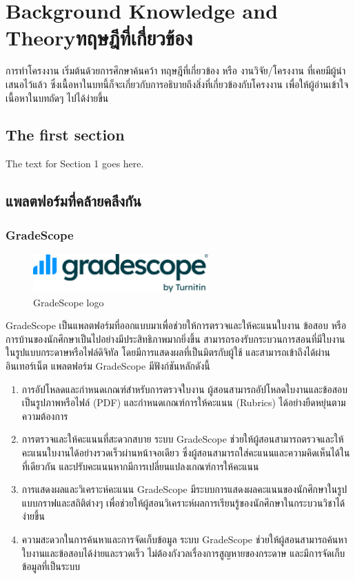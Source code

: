 \chapter{\ifenglish Background Knowledge and Theory\else ทฤษฎีที่เกี่ยวข้อง\fi}

\qquad การทำโครงงาน เริ่มต้นด้วยการศึกษาค้นคว้า ทฤษฎีที่เกี่ยวข้อง หรือ งานวิจัย/โครงงาน ที่เคยมีผู้นำเสนอไว้แล้ว ซึ่งเนื้อหาในบทนี้ก็จะเกี่ยวกับการอธิบายถึงสิ่งที่เกี่ยวข้องกับโครงงาน เพื่อให้ผู้อ่านเข้าใจเนื้อหาในบทถัดๆ ไปได้ง่ายขึ้น

\section{The first section}
The text for Section 1 goes here.

\section{แพลตฟอร์มที่คล้ายคลึงกัน}
  \subsection{GradeScope}
    \begin{figure}[!h]
      \centering
      \includegraphics[width=0.6\textwidth]{image/Background/gradescope-logo.png}
      \caption[GradeScope]{GradeScope logo}
      \label{fig:gradescope_pic}
    \end{figure}
    \FloatBarrier
    \qquad GradeScope เป็นแพลตฟอร์มที่ออกแบบมาเพื่อช่วยให้การตรวจและให้คะแนนใบงาน ข้อสอบ หรือการบ้านของนักศึกษาเป็นไปอย่างมีประสิทธิภาพมากยิ่งขึ้น สามารถรองรับกระบวนการสอนที่มีใบงานในรูปแบบกระดาษหรือไฟล์ดิจิทัล โดยมีการแสดงผลที่เป็นมิตรกับผู้ใช้ และสามารถเข้าถึงได้ผ่านอินเทอร์เน็ต แพลตฟอร์ม GradeScope มีฟังก์ชันหลักดังนี้
      \begin{enumerate}
        \item การอัปโหลดและกำหนดเกณฑ์สำหรับการตรวจใบงาน ผู้สอนสามารถอัปโหลดใบงานและข้อสอบเป็นรูปภาพหรือไฟล์ (PDF) และกำหนดเกณฑ์การให้คะแนน (Rubrics) ได้อย่างยืดหยุ่นตามความต้องการ
        \item การตรวจและให้คะแนนที่สะดวกสบาย ระบบ GradeScope ช่วยให้ผู้สอนสามารถตรวจและให้คะแนนใบงานได้อย่างรวดเร็วผ่านหน้าจอเดียว ซึ่งผู้สอนสามารถใส่คะแนนและความคิดเห็นได้ในที่เดียวกัน และปรับคะแนนหากมีการเปลี่ยนแปลงเกณฑ์การให้คะแนน
        \item การแสดงผลและวิเคราะห์คะแนน GradeScope มีระบบการแสดงผลคะแนนของนักศึกษาในรูปแบบกราฟและสถิติต่างๆ เพื่อช่วยให้ผู้สอนวิเคราะห์ผลการเรียนรู้ของนักศึกษาในกระบวนวิชาได้ง่ายขึ้น
        \item ความสะดวกในการค้นหาและการจัดเก็บข้อมูล ระบบ GradeScope ช่วยให้ผู้สอนสามารถค้นหาใบงานและข้อสอบได้ง่ายและรวดเร็ว ไม่ต้องกังวลเรื่องการสูญหายของกระดาษ และมีการจัดเก็บข้อมูลที่เป็นระบบ
      \end{enumerate}
